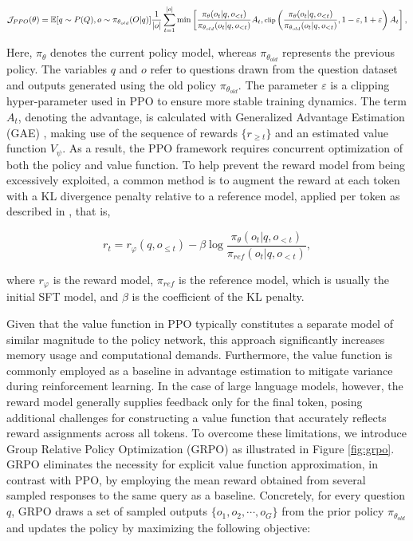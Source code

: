 \begin{itemize}[topsep=0pt]
\begin{equation}
\footnotesize
    \mathcal{J}_{PPO}(\theta) = \mathbb{E}{[q \sim P(Q), o \sim \pi_{\theta_{old}}(O|q)]} \frac{1}{|o|} \sum_{t=1}^{|o|} \min \left[ \frac{\pi_\theta(o_{t} | q, o_{<t})}{\pi_{\theta_{old}}(o_{t} | q, o_{<t})} A_{t}, \text{clip} \left( \frac{\pi_\theta(o_{t} | q, o_{<t})}{\pi_{\theta_{old}}(o_{t} | q, o_{<t})}, 1 - \varepsilon, 1 + \varepsilon \right)  A_{t} \right] ,
\end{equation}

Here, $\pi_{\theta}$ denotes the current policy model, whereas $\pi_{\theta_{old}}$ represents the previous policy. The variables $q$ and $o$ refer to questions drawn from the question dataset and outputs generated using the old policy $\pi_{\theta_{old}}$. The parameter $\varepsilon$ is a clipping hyper-parameter used in PPO to ensure more stable training dynamics. The term $A_t$, denoting the advantage, is calculated with Generalized Advantage Estimation (GAE) \citep{gae}, making use of the sequence of rewards $\{r_{\ge t}\}$ and an estimated value function $V_{\psi}$. As a result, the PPO framework requires concurrent optimization of both the policy and value function. To help prevent the reward model from being excessively exploited, a common method is to augment the reward at each token with a KL divergence penalty relative to a reference model, applied per token as described in \citep{ouyang2022training}, that is,

\begin{equation}
    r_{t} = r_\varphi(q, o_{\le t}) - \beta \log\frac{\pi_{\theta}(o_{t}|q, o_{<t})}{\pi_{ref}(o_{t}|q, o_{<t})},
\label{eq:PPO-reward}
\end{equation}

where $r_\varphi$  is the reward model, $\pi_{ref}$ is the reference model, which is usually the initial SFT model, and $\beta$  is the coefficient of the KL penalty.

Given that the value function in PPO typically constitutes a separate model of similar magnitude to the policy network, this approach significantly increases memory usage and computational demands. Furthermore, the value function is commonly employed as a baseline in advantage estimation to mitigate variance during reinforcement learning. In the case of large language models, however, the reward model generally supplies feedback only for the final token, posing additional challenges for constructing a value function that accurately reflects reward assignments across all tokens. To overcome these limitations, we introduce Group Relative Policy Optimization (GRPO) as illustrated in Figure \ref{fig:grpo}. GRPO eliminates the necessity for explicit value function approximation, in contrast with PPO, by employing the mean reward obtained from several sampled responses to the same query as a baseline. Concretely, for every question $q$, GRPO draws a set of sampled outputs $\{o_1, o_2, \cdots, o_G\}$ from the prior policy $\pi_{\theta_{old}}$ and updates the policy by maximizing the following objective:


\end{itemize}
